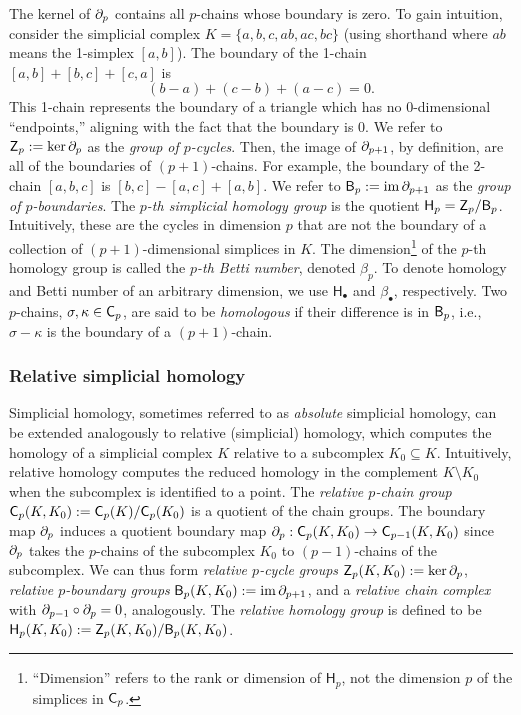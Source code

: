 \documentclass{amsart}
\newcommand{\Bgroup}        {\mm{\sf B}}
\newcommand{\Cgroup}        {\mm{\sf C}}
\newcommand{\Hgroup}	     {\mathsf{H}}
\newcommand{\Zgroup}        {\mm{\sf Z}}
\renewcommand{\hom}[2]{\Hgroup_{#2}^{#1}}
\newcommand{\betti}[2]{\beta_{#2}^{#1}}
\DeclareMathOperator{\im}{im}
\newcommand{\bdr}{\mm{\mathrm{\partial}}}
\newcommand {\mm}[1]        {\ifmmode{#1}\else{\mbox{\(#1\)}}\fi}
\begin{document}
The kernel of $\bdr_{p}$ contains all $p$-chains whose boundary is zero.
To gain intuition, consider the simplicial complex $K=\{a,b,c,ab,ac,bc\}$ (using shorthand where $ab$ means the 1-simplex $[a,b]$).
The boundary of the 1-chain $[a,b]+[b,c]+[c,a]$ is
\[ (b-a) + (c-b) + (a-c) = 0.\]
This 1-chain represents the boundary of a triangle which has no 0-dimensional ``endpoints,'' aligning with the fact that the boundary is 0.
We refer to $\Zgroup_{p} := \ker\bdr_{p}$ as the \emph{group of $p$-cycles}.
Then, the image of $\bdr_{p+1}$, by definition, are all of the boundaries of $(p+1)$-chains.
For example, the boundary of the 2-chain $[a, b, c]$ is $[b,c] - [a,c] + [a,b]$.
We refer to $\Bgroup_p := \im\bdr_{p+1}$ as the \emph{group of $p$-boundaries}.
The \emph{$p$-th simplicial homology group} is the quotient $\Hgroup_p = \Zgroup_{p}/\Bgroup_p$.
Intuitively, these are the cycles in dimension $p$ that are not the boundary of a collection of $(p+1)$-dimensional simplices in $K$.
The dimension\footnote{``Dimension'' refers to the rank or dimension of $\Hgroup_p$, not the dimension $p$ of the simplices in $\Cgroup_p$.} of the $p$-th homology group is called the \emph{$p$-th Betti number}, denoted $\betti{}{p}$.
To denote homology and Betti number of an arbitrary dimension, we use $\hom{}{\bullet}$ and $\betti{}{\bullet}$, respectively.
Two $p$-chains, $\sigma, \kappa \in \Cgroup_p$, are said to be \emph{homologous} if their difference is in $\Bgroup_p$, i.e., $\sigma - \kappa$ is the boundary of a $(p+1)$-chain.

\subsubsection{Relative simplicial homology}\label{sec:rel_hom}
Simplicial homology, sometimes referred to as \emph{absolute} simplicial homology, can be extended analogously to relative (simplicial) homology, which computes the homology of a simplicial complex $K$ relative to a subcomplex $K_0 \subseteq K$. Intuitively, relative homology computes the reduced homology in the complement $K \setminus K_0$ when the subcomplex is identified to a point.
The \emph{relative $p$-chain group} $\Cgroup_p(K,K_0):=\Cgroup_p(K)/\Cgroup_p(K_0)$ is a quotient of the chain groups.
The boundary map $\bdr_p$ induces a quotient boundary map $\bdr_p:\Cgroup_p(K,K_0)\to \Cgroup_{p-1}(K,K_0)$ since $\bdr_p$ takes the $p$-chains of the subcomplex $K_0$ to $(p-1)$-chains of the subcomplex.
We can thus form \emph{relative $p$-cycle groups} $\Zgroup_p(K,K_0):=\ker \bdr_p$, \emph{relative $p$-boundary groups} $\Bgroup_p(K,K_0):=\im \bdr_{p+1}$, and a \emph{relative chain complex} with $\bdr_{p-1}\circ\bdr_p = 0$, analogously.
The \emph{relative homology group} is defined to be  $\Hgroup_p(K,K_0):= \Zgroup_p(K,K_0)/\Bgroup_p(K,K_0)$.
\end{document}
